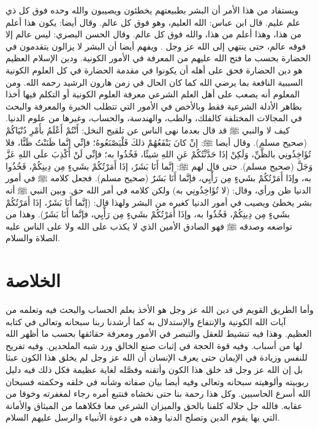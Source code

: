 ويستفاد من هذا الأمر أن البشر بطبيعتهم يخطئون ويصيبون والله وحده فوق كل ذي علم عليم. قال ابن عباس: الله العليم، وهو فوق كل عالم. وقال أيضا: يكون هذا أعلم من هذا، وهذا أعلم من هذا، والله فوق كل عالم. وقال الحسن البصري: ليس عالم إلا فوقه عالم، حتى ينتهي إلى الله عز وجل \cite{tafsir_ibnKathir}. ويفهم أيضا أن البشر لا يزالون يتقدمون في الحضارة بحسب ما فتح الله عليهم من المعرفة في الأمور الكونية. ودين الإسلام العظيم هو دين الحضارة فحق على أهله أن يكونوا في مقدمة الحضارة في كل العلوم الكونية السببية النافعة بما يرضي الله كما كان الحال في زمن هارون الرشيد رحمه الله. ومن المعلوم أنه يصعب على أهل العلم الشرعي معرفة العلوم الكونية أو التكلم فيها أخذا بظاهر الأدلة الشرعية فقط وبالأخص في الأمور التي تتطلب الخبرة والمعرفة والبحث في المجالات المختلفة كالفلك، والطب، والهندسة، والحساب، وغيرها من علوم الدنيا. كيف لا والنبي ﷺ قد قال بعدما نهى الناس عن تلقيح النخل: أَنْتُمْ أَعْلَمُ بأَمْرِ دُنْيَاكُمْ {\footnotesize (صحيح مسلم)}. وقال أيضا ﷺ: إنْ كانَ يَنْفَعُهُمْ ذلكَ فَلْيَصْنَعُوهُ؛ فإنِّي إنَّما ظَنَنْتُ ظَنًّا، فلا تُؤَاخِذُونِي بالظَّنِّ، وَلَكِنْ إذَا حَدَّثْتُكُمْ عَنِ اللهِ شيئًا، فَخُذُوا به؛ فإنِّي لَنْ أَكْذِبَ علَى اللهِ عَزَّ وَجَلَّ {\footnotesize (صحيح مسلم)}. حتى قال لهم ﷺ: إنَّما أَنَا بَشَرٌ، إذَا أَمَرْتُكُمْ بشَيءٍ مِن دِينِكُمْ، فَخُذُوا به، وإذَا أَمَرْتُكُمْ بشَيءٍ مِن رَأْيِي، فإنَّما أَنَا بَشَرٌ {\footnotesize (صحيح مسلم)}. فجعل كلامه ﷺ في أمور الدنيا ظن ورأي، وقال: (لا تُؤَاخِذُونِي به) ولكن كلامه في أمر الله حق. وبين النبي ﷺ أنه بشر يخطئ ويصيب في أمور الدنيا كغيره من البشر ولهذا قال:  (إنَّما أَنَا بَشَرٌ، إذَا أَمَرْتُكُمْ بشَيءٍ مِن دِينِكُمْ، فَخُذُوا به، وإذَا أَمَرْتُكُمْ بشَيءٍ مِن رَأْيِي، فإنَّما أَنَا بَشَرٌ). وهذا من تواضعه وصدقه ﷺ فهو الصادق الأمين الذي لا يكذب على الله ولا على الناس عليه الصلاة والسلام.

\section{الخلاصة}

وأما الطريق القويم في دين الله عز وجل هو الأخذ بعلم الحساب والبحث فيه وتعلمه من آيات الله الكونية والإنتفاع والإستدلال به كما أرشدنا ربنا سبحانه وتعالى في كتابه العظيم. وهذا فيه تنشيط للعقل والتبصر في الأمور ومعرفة حقائقها بحسب ما أظهر الله لها من أسباب. وفيه قوة الحجة في إثبات صنع الخالق ورد شبه الملحدين. وفيه تفريح للنفس وزيادة في الإيمان حتى يعرف الإنسان أن الله عز وجل لم يخلق هذا الكون عبثا بل إن الله عز وجل قد خلق هذا الكون وأتقنه وفصَّله لغاية عظيمة فكل ذلك فيه دليل ربوبيته وألوهيته سبحانه وتعالى وفيه أيضا بيان صفاته وشأنه في خلقه وحكمته فسبحان الله أسرع الحاسبين. وكل هذا رحمة بنا حتى نخشاه فنتبع أمره رجاء لمغفرته وخوفا من عقابه. فالله جل جلاله كلفنا بالحق والميزان الشرعي معا فكلاهما من الميثاق والأمانة التي بها يقوم الدين وتصلح الدنيا وهذه هي دعوة الأنبياء والرسل عليهم السلام.

